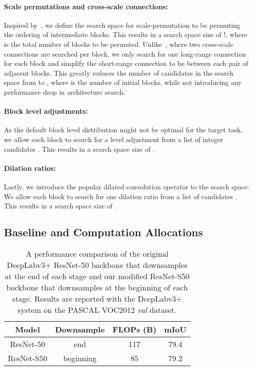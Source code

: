 \documentclass[10pt,twocolumn,letterpaper]{article}
\begin{document}
\paragraph{Scale permutations and cross-scale connections:} Inspired by~\cite{spinenet}, we define the search space for scale-permutation to be permuting the ordering of intermediate blocks. This results in a search space size of !, where  is the total number of blocks to be permuted. Unlike~\cite{spinenet}, where two cross-scale connections are searched per block, we only search for one long-range connection for each block and simplify the short-range connection to be between each pair of adjacent blocks. This greatly reduces the number of candidates in the search space from  to , where  is the number of initial blocks, while not introducing any performance drop in architecture search.

\paragraph{Block level adjustments:} As the default block level distribution might not be optimal for the target task, we allow each block to search for a level adjustment from a list of integer candidates . This results in a search space size of .



\paragraph{Dilation ratios:} Lastly, we introduce the popular dilated convolution operator to the search space. We allow each block to search for one dilation ratio from a list of candidates . This results in a search space size of .

\subsection{Baseline and Computation Allocations}\label{sec:search_baseline}

\setlength{\tabcolsep}{4pt}
\begin{table}[h!]
\centering
\begin{tabular}{c| c | c  c}
  \toprule
  Model & Downsample & FLOPs (B) & mIoU  \\
  \midrule
  ResNet-50 & end & 117 & 79.4 \\
  ResNet-S50 & beginning & 85 & 79.2 \\
  \bottomrule
\end{tabular}
\caption{A performance comparison of the original DeepLabv3+ ResNet-50 backbone that downsamples at the end of each stage and our modified ResNet-S50 backbone that downsamples at the beginning of each stage. Results are reported with the DeepLabv3+ system on the PASCAL VOC2012 \textit{val} dataset.}
\label{tab:modified_deeplab_resnet} 
\end{table}
\end{document}
